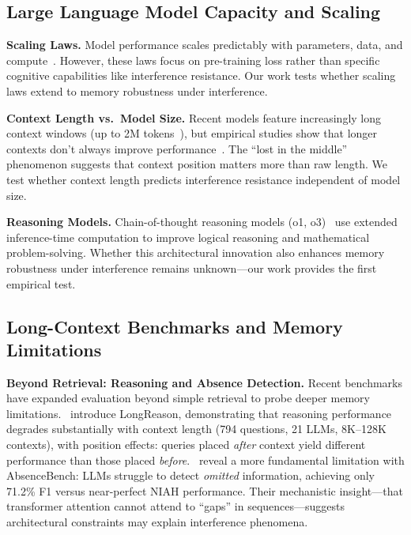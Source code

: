 \documentclass{article}
\begin{document}
\subsection{Large Language Model Capacity and Scaling}

\textbf{Scaling Laws.} Model performance scales predictably with parameters, data, and compute~\citep{kaplan2020scaling, hoffmann2022chinchilla}. However, these laws focus on pre-training loss rather than specific cognitive capabilities like interference resistance. Our work tests whether scaling laws extend to memory robustness under interference.

\textbf{Context Length vs.\ Model Size.} Recent models feature increasingly long context windows (up to 2M tokens~\citep{gemini2023}), but empirical studies show that longer contexts don't always improve performance~\citep{liu2024lost}. The ``lost in the middle'' phenomenon suggests that context position matters more than raw length. We test whether context length predicts interference resistance independent of model size.

\textbf{Reasoning Models.} Chain-of-thought reasoning models (o1, o3)~\citep{openai2024o1} use extended inference-time computation to improve logical reasoning and mathematical problem-solving. Whether this architectural innovation also enhances memory robustness under interference remains unknown---our work provides the first empirical test.

\subsection{Long-Context Benchmarks and Memory Limitations}

\textbf{Beyond Retrieval: Reasoning and Absence Detection.} Recent benchmarks have expanded evaluation beyond simple retrieval to probe deeper memory limitations.~\citet{ling2025longreason} introduce LongReason, demonstrating that reasoning performance degrades substantially with context length (794 questions, 21 LLMs, 8K--128K contexts), with position effects: queries placed \textit{after} context yield different performance than those placed \textit{before}.~\citet{fu2025absencebench} reveal a more fundamental limitation with AbsenceBench: LLMs struggle to detect \textit{omitted} information, achieving only 71.2\% F1 versus near-perfect NIAH performance. Their mechanistic insight---that transformer attention cannot attend to ``gaps'' in sequences---suggests architectural constraints may explain interference phenomena.
\end{document}
